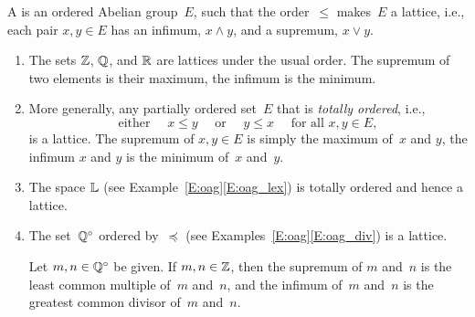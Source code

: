\documentclass[main.tex]{subfiles}
\begin{document}
%
%
\begin{dfn}
\label{D:loag}
A 
is an ordered Abelian group~$E$,
such that the order~$\leq$ 
makes~$E$ a lattice,
i.e., each pair $x,y\in E$
has an infimum, $x\wedge y$,
and a supremum, $x\vee y$.
\end{dfn}
\begin{exs}
\label{E:loag}
\begin{enumerate}
\item
The sets
$\mathbb{Z}$, $\mathbb{Q}$, and $\mathbb{R}$ are lattices
under the usual order.
The supremum of two elements is their maximum,
the infimum is the minimum.

\item
More generally,
any partially ordered set~$E$
that is \emph{totally ordered},
i.e.,
\begin{equation*}
\text{either } \quad x\leq y\quad\text{ or } 
\quad y\leq x\quad \text{ for all }x,y\in E,
\end{equation*}
is a lattice.
The supremum of $x,y\in E$ is simply the maximum of~$x$ and $y$,
the infimum $x$ and $y$ is the minimum of~$x$ and~$y$.

\item
The space $\mathbb{L}$
(see Example~\ref{E:oag}\ref{E:oag_lex})
is totally ordered and hence a lattice.

\item
\label{E:loag_div}
The set~$\mathbb{Q}^\circ$ ordered by~$\preccurlyeq$
(see Examples~\ref{E:oag}\ref{E:oag_div})
is a lattice.

Let $m,n\in \mathbb{Q}^\circ$ be given.
If $m,n\in \mathbb{Z}$, then the supremum of $m$ and~$n$
is the least common multiple of~$m$ and~$n$,
and the infimum of~$m$ and~$n$ is the greatest common divisor
of~$m$ and~$n$.

\end{enumerate}
\end{exs}
\end{document}
